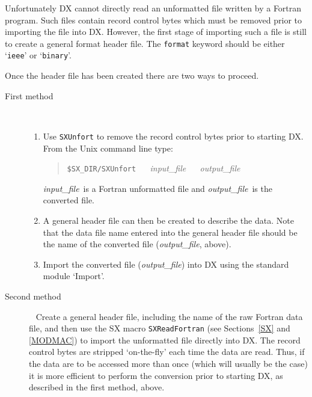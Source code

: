 Unfortunately DX cannot directly read an unformatted file written by
a Fortran program. Such files contain record control bytes which must
be  removed prior to importing the file into DX. However, the first
stage of importing such a file is still to create a general format
header file. The {\tt format} keyword should be either `{\tt ieee}'
or `{\tt binary}'.

Once the header file has been created there are two ways to proceed.

\pagebreak[4]
\begin{description}

  \item[First method] ~
  \begin{enumerate}

    \item Use {\tt SXUnfort} to remove the record control bytes prior
     to starting DX. From the Unix command line type:

    \begin{quote}
     {\tt \$SX\_DIR/SXUnfort} ~~ {\it input\_file} ~~ {\it output\_file}
    \end{quote}

     {\it input\_file}\, is a Fortran unformatted file and {\it
     output\_file}\, is the converted file.

    \item A general header file can then be created to describe the data.
     Note that the data file name entered into the general header
     file should be the name of the converted file ({\it{output\_file}},
     above).

    \item Import the converted file ({\it{output\_file}}) into DX using the
     standard module `Import'.

  \end{enumerate}

  \item[Second method] ~
  \newline Create a general header file, including the name of the raw
   Fortran data file, and then use the SX macro {\tt{SXReadFortran}} 
   (see Sections~\ref{SX} and \ref{MODMAC}) to import the unformatted
   file directly into DX. The record control bytes are stripped 
   `on-the-fly' each time the data are read. Thus, if the data are
   to be accessed more than once (which will usually be the case) it
   is more efficient to perform the conversion prior to starting DX,
   as described in the first method, above.

\end{description}

